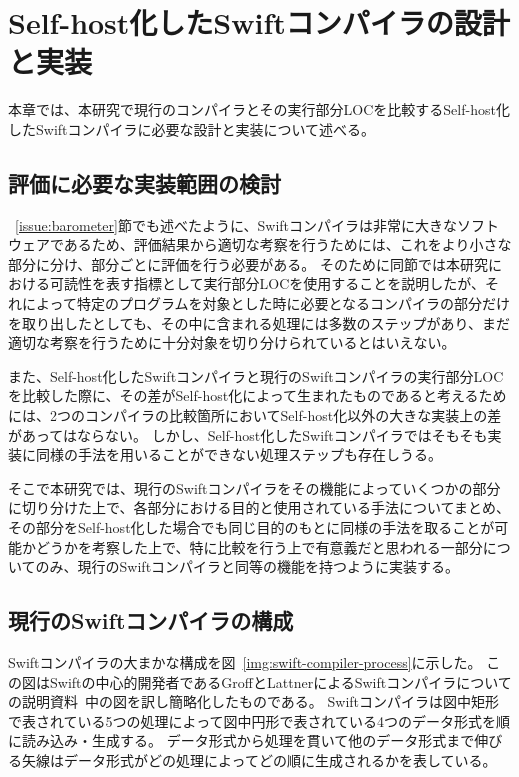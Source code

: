 \chapter{Self-host化したSwiftコンパイラの設計と実装}
\label{implementation}

本章では、本研究で現行のコンパイラとその実行部分LOCを比較するSelf-host化したSwiftコンパイラに必要な設計と実装について述べる。

\section{評価に必要な実装範囲の検討}
\label{implementation:refinement}

~\ref{issue:barometer}節でも述べたように、Swiftコンパイラは非常に大きなソフトウェアであるため、評価結果から適切な考察を行うためには、これをより小さな部分に分け、部分ごとに評価を行う必要がある。
そのために同節では本研究における可読性を表す指標として実行部分LOCを使用することを説明したが、それによって特定のプログラムを対象とした時に必要となるコンパイラの部分だけを取り出したとしても、その中に含まれる処理には多数のステップがあり、まだ適切な考察を行うために十分対象を切り分けられているとはいえない。

また、Self-host化したSwiftコンパイラと現行のSwiftコンパイラの実行部分LOCを比較した際に、その差がSelf-host化によって生まれたものであると考えるためには、2つのコンパイラの比較箇所においてSelf-host化以外の大きな実装上の差があってはならない。
しかし、Self-host化したSwiftコンパイラではそもそも実装に同様の手法を用いることができない処理ステップも存在しうる。

そこで本研究では、現行のSwiftコンパイラをその機能によっていくつかの部分に切り分けた上で、各部分における目的と使用されている手法についてまとめ、その部分をSelf-host化した場合でも同じ目的のもとに同様の手法を取ることが可能かどうかを考察した上で、特に比較を行う上で有意義だと思われる一部分についてのみ、現行のSwiftコンパイラと同等の機能を持つように実装する。

\section{現行のSwiftコンパイラの構成}
\label{refinement:structure}

Swiftコンパイラの大まかな構成を図~\ref{img:swift-compiler-process}に示した。
この図はSwiftの中心的開発者であるGroffとLattnerによるSwiftコンパイラについての説明資料~\cite{sil}中の図を訳し簡略化したものである。
Swiftコンパイラは図中矩形で表されている5つの処理によって図中円形で表されている4つのデータ形式を順に読み込み・生成する。
データ形式から処理を貫いて他のデータ形式まで伸びる矢線はデータ形式がどの処理によってどの順に生成されるかを表している。

